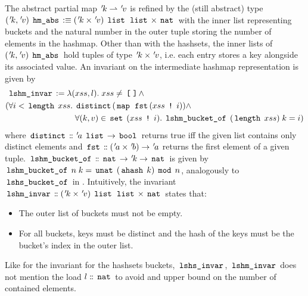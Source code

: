 The abstract partial map ${\mskip2mu '\mskip-2muk} \rightharpoonup {\mskip2mu '\mskip-2muv}$ is refined by the (still abstract) type $({\mskip2mu '\mskip-2muk}, {\mskip2mu '\mskip-2muv}) \; \,\text{\ttfamily hm\_abs}\, :\equiv ({\mskip2mu '\mskip-2muk} \times {\mskip2mu '\mskip-2muv}) \; \,\text{\ttfamily list}\, \; \,\text{\ttfamily list}\, \times \,\text{\ttfamily nat}\,$ with the inner list representing buckets and the natural number in the outer tuple storing the number of elements in the hashmap.
Other than with the hashsets, the inner lists of $({\mskip2mu '\mskip-2muk}, {\mskip2mu '\mskip-2muv}) \; \,\text{\ttfamily hm\_abs}\,$ hold tuples of type ${\mskip2mu '\mskip-2muk} \times {\mskip2mu '\mskip-2muv}$, i.e. each entry stores a key alongside its associated value.
An invariant on the intermediate hashmap representation is given by
\begin{align*}
	\,\text{\ttfamily lshm\_invar}\, := \lambda (           & xss, l). \; xss \neq \,\text{\ttfamily [\;]}\, \land                                                                                           \\
	(\forall i < \,\text{\ttfamily length}\, \; xss. \; & \,\text{\ttfamily distinct}\, (\,\text{\ttfamily map}\, \; \,\text{\ttfamily fst}\, (xss \; \,\text{\ttfamily !}\, \; i)) \land                                                        \\
	                                          & \forall (k,v) \in \,\text{\ttfamily set}\, \; (xss \; \,\text{\ttfamily !}\, \; i). \; \,\text{\ttfamily lshm\_bucket\_of}\, \; (\,\text{\ttfamily length}\, \; xss) \; k = i)
\end{align*}
where $\,\text{\ttfamily distinct}\, \mathrel{\mathord{:}\mkern-1.2mu\mathord{:}} {\mskip2mu '\mskip-2mua} \; \,\text{\ttfamily list}\, \rightarrow \,\text{\ttfamily bool}\,$ returns true iff the given list contains only distinct elements and $\,\text{\ttfamily fst}\, \mathrel{\mathord{:}\mkern-1.2mu\mathord{:}} ({\mskip2mu '\mskip-2mua} \times {\mskip2mu '\mskip-2mub}) \rightarrow {\mskip2mu '\mskip-2mua}$ returns the first element of a given tuple.
$\,\text{\ttfamily lshm\_bucket\_of}\, \mathrel{\mathord{:}\mkern-1.2mu\mathord{:}} \,\text{\ttfamily nat}\, \rightarrow {\mskip2mu '\mskip-2muk} \rightarrow \,\text{\ttfamily nat}\,$ is given by $\,\text{\ttfamily lshm\_bucket\_of}\, \; n \; k = \,\text{\ttfamily unat}\, \; (\,\text{\ttfamily ahash}\, \; k) \; \,\text{\ttfamily mod}\, \; n$, analogously to $\,\text{\ttfamily lshs\_bucket\_of}\,$ in .
Intuitively, the invariant $\,\text{\ttfamily lshm\_invar}\, \mathrel{\mathord{:}\mkern-1.2mu\mathord{:}} ({\mskip2mu '\mskip-2muk} \times {\mskip2mu '\mskip-2muv}) \; \,\text{\ttfamily list}\, \; \,\text{\ttfamily list}\, \times \,\text{\ttfamily nat}\,$ states that:
\begin{itemize}
	\item The outer list of buckets must not be empty.
	\item For all buckets, keys must be distinct and the hash of the keys must be the bucket's index in the outer list.
\end{itemize}
Like for the invariant for the hashsets buckets, $\,\text{\ttfamily lshs\_invar}\,$, $\,\text{\ttfamily lshm\_invar}\,$ does not mention the load $l \mathrel{\mathord{:}\mkern-1.2mu\mathord{:}} \,\text{\ttfamily nat}\,$ to avoid and upper bound on the number of contained elements.

